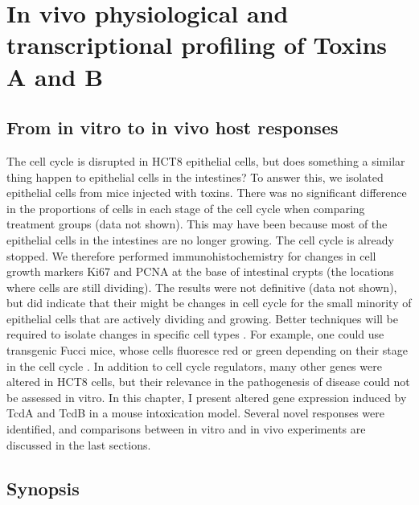 
\chapter[In vivo toxin responses]
{ In vivo physiological and transcriptional profiling of Toxins A and B }\label{chapter:ini}

\section{From in vitro to in vivo host responses}
The cell cycle is disrupted in HCT8 epithelial cells, but does something a similar
thing happen to epithelial cells in the intestines? To answer this,
we isolated epithelial cells from mice injected with toxins.
There was no significant difference in the proportions of cells in each stage of the
cell cycle when comparing treatment groups (data not shown). This may have been
because most of the epithelial cells in the intestines are no longer growing.
The cell cycle is already stopped.
We therefore performed immunohistochemistry for changes in cell growth markers
Ki67 and PCNA at the base of intestinal crypts (the locations where cells are still
dividing). The results were not definitive (data not shown), but did
indicate that their might be changes in cell cycle for the small minority of
epithelial cells that are actively dividing and growing. Better techniques
will be required to isolate changes in specific cell 
types \cite{Blanpain:2013tq,Barker:2012ul}. For example,
one could use transgenic Fucci mice, whose cells fluoresce red or green depending
on their stage in the cell cycle \cite{SakaueSawano:2008ul}.
In addition to cell cycle regulators, many other genes were altered
in HCT8 cells, but their relevance in the pathogenesis of disease
could not be assessed in vitro. In this chapter, I present altered gene expression
induced by TcdA and TcdB in a mouse intoxication model. Several novel
responses were identified, and comparisons between in vitro and in vivo
experiments are discussed in the last sections.


\section{Synopsis}

